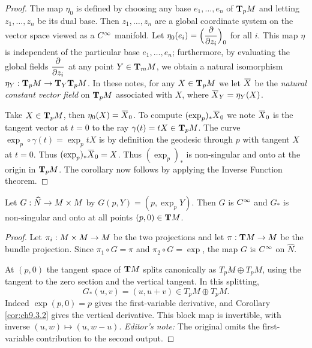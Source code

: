 \documentclass[../main]{subfiles}
\begin{document}
\begin{proof}
The map $\eta_0$ is defined by choosing any base $e_1,\dots, e_n$ of $\tangentspace{M}{p}$ and letting $z_1,\dots, z_n$ be its dual base. Then $z_1,\dots,z_n$ are a global coordinate system on the vector space viewed as a $\CInfty$ manifold. Let $\eta_0(e_i) = \Big(\pdv{}{z_i}\Big)_0$ for all $i$. This map $\eta$ is independent of the particular base $e_1,\dots,e_n$; furthermore, by evaluating the global fields $\pdv{}{z_i}$ at any point $Y \in \tangentspace{M}{m}$, we obtain a natural isomorphism $\eta_Y:\tangentspace{M}{p} \functionMaps \tangentspace{\tangentspace{M}{p}}{Y}$. In these notes, for any $X \in \tangentspace{M}{p}$ we let $\xoverline X$ be the \emph{natural constant vector field} on $\tangentspace{M}{p}$ associated with $X$, where $\xoverline X_Y = \eta_Y(X)$. 

Take $X \in \tangentspace{M}{p}$, then $\eta_0(X) = \xoverline X_0$. To compute $(\exp_p)_\ast\xoverline X_0$ we note $\xoverline X_0$ is the tangent vector at $t=0$ to the ray $\gamma(t) = tX \in \tangentspace{M}{p}$. The curve \newline $\exp_p \circ \gamma(t) = \exp_p tX$ is by definition the geodesic through $p$ with tangent $X$ at $t=0$. Thus $(\exp_p)_\ast\xoverline X_0 = X$. Thus $(\exp_p)_\ast$ is non-singular and onto at the origin in $\tangentspace{M}{p}$. The corollary now follows by applying the Inverse Function theorem.
\end{proof}



\begin{corollary} \label{cor:ch9.3.3}
Let $G: \widehat N \functionMaps M\times M$ by $G(p, Y) = (p, \exp_pY)$. Then $G$ is $\CInfty$ and $G_\ast$ is non-singular and onto at all points $(p, 0) \in \tangentbundle{M}$.
\end{corollary} 

\begin{proof}
Let $\pi_i:M\times M\functionMaps M$ be the two projections and let $\pi:\tangentbundle{M}\functionMaps M$ be the bundle projection. Since $\pi_1\circ G=\pi$ and $\pi_2\circ G=\exp$, the map $G$ is $\CInfty$ on $\widehat N$.

At $(p,0)$ the tangent space of $\tangentbundle{M}$ splits canonically as $T_pM\oplus T_pM$, using the tangent to the zero section and the vertical tangent. In this splitting,
\[G_\ast(u,v)=(u,u+v)\in T_pM\oplus T_pM.\]
Indeed $\exp(p,0)=p$ gives the first-variable derivative, and Corollary \ref{cor:ch9.3.2} gives the vertical derivative. This block map is invertible, with inverse $(u,w)\mapsto(u,w-u)$. \emph{Editor's note:} The original omits the first-variable contribution to the second output.
\end{proof}
\end{document}
